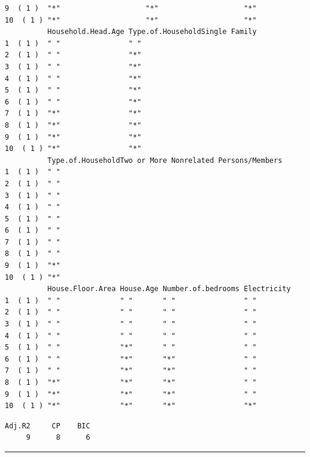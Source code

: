 \documentclass[
]{article}
\begin{document}
\begin{verbatim}
9  ( 1 )  "*"                    "*"                    "*"                   
10  ( 1 ) "*"                    "*"                    "*"                   
          Household.Head.Age Type.of.HouseholdSingle Family
1  ( 1 )  " "                " "                           
2  ( 1 )  " "                "*"                           
3  ( 1 )  " "                "*"                           
4  ( 1 )  " "                "*"                           
5  ( 1 )  " "                "*"                           
6  ( 1 )  " "                "*"                           
7  ( 1 )  "*"                "*"                           
8  ( 1 )  "*"                "*"                           
9  ( 1 )  "*"                "*"                           
10  ( 1 ) "*"                "*"                           
          Type.of.HouseholdTwo or More Nonrelated Persons/Members
1  ( 1 )  " "                                                    
2  ( 1 )  " "                                                    
3  ( 1 )  " "                                                    
4  ( 1 )  " "                                                    
5  ( 1 )  " "                                                    
6  ( 1 )  " "                                                    
7  ( 1 )  " "                                                    
8  ( 1 )  " "                                                    
9  ( 1 )  "*"                                                    
10  ( 1 ) "*"                                                    
          House.Floor.Area House.Age Number.of.bedrooms Electricity
1  ( 1 )  " "              " "       " "                " "        
2  ( 1 )  " "              " "       " "                " "        
3  ( 1 )  " "              " "       " "                " "        
4  ( 1 )  " "              " "       " "                " "        
5  ( 1 )  " "              "*"       " "                " "        
6  ( 1 )  " "              "*"       "*"                " "        
7  ( 1 )  " "              "*"       "*"                " "        
8  ( 1 )  "*"              "*"       "*"                " "        
9  ( 1 )  "*"              "*"       "*"                " "        
10  ( 1 ) "*"              "*"       "*"                "*"        
\end{verbatim}

\begin{verbatim}
Adj.R2     CP    BIC 
     9      8      6 
\end{verbatim}

\begin{center}\rule{0.5\linewidth}{0.5pt}\end{center}
\end{document}
